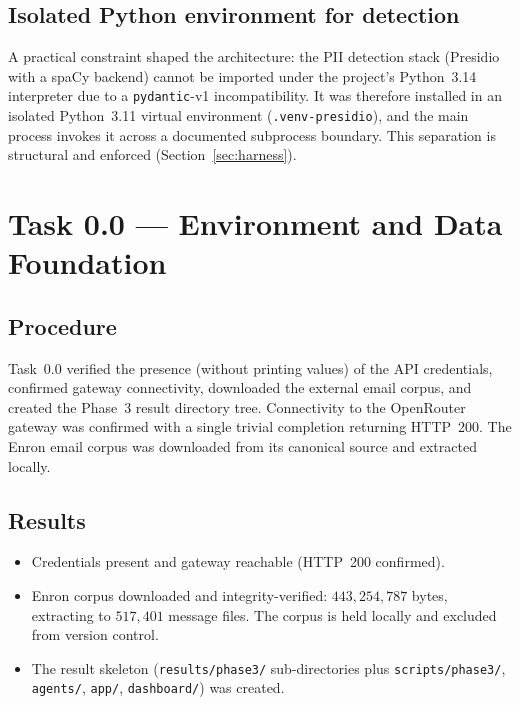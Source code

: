 \documentclass[11pt,a4paper]{article}
\newcommand{\code}[1]{\texttt{\small #1}}
\begin{document}
\subsection{Isolated Python environment for detection}
A practical constraint shaped the architecture: the PII detection stack (Presidio with a spaCy backend) cannot be imported under the project's Python~3.14 interpreter due to a \code{pydantic}-v1 incompatibility. It was therefore installed in an isolated Python~3.11 virtual environment (\code{.venv-presidio}), and the main process invokes it across a documented subprocess boundary. This separation is structural and enforced (Section~\ref{sec:harness}).

\section{Task 0.0 --- Environment and Data Foundation}

\subsection{Procedure}
Task~0.0 verified the presence (without printing values) of the API credentials, confirmed gateway connectivity, downloaded the external email corpus, and created the Phase~3 result directory tree. Connectivity to the OpenRouter gateway was confirmed with a single trivial completion returning HTTP~200. The Enron email corpus was downloaded from its canonical source and extracted locally.

\subsection{Results}
\begin{itemize}[leftmargin=1.4cm]
\item Credentials present and gateway reachable (HTTP~200 confirmed).
\item Enron corpus downloaded and integrity-verified: $443{,}254{,}787$ bytes, extracting to $517{,}401$ message files. The corpus is held locally and excluded from version control.
\item The result skeleton (\code{results/phase3/} sub-directories plus \code{scripts/phase3/}, \code{agents/}, \code{app/}, \code{dashboard/}) was created.
\end{itemize}
\end{document}
